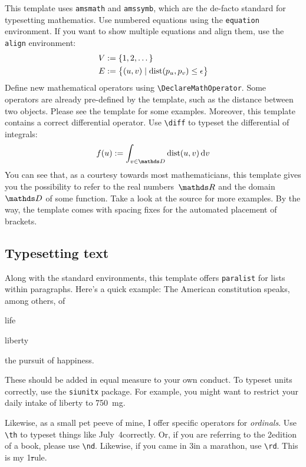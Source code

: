 This template uses \verb|amsmath| and \verb|amssymb|, which are the
de-facto standard for typesetting mathematics. Use numbered equations
using the \verb|equation| environment.
%
If you want to show multiple equations and align them, use the
\verb|align| environment:
%
\begin{align}
    V &:= \{ 1, 2, \dots \}\\
    E &:= \big\{ \left(u,v\right) \mid \dist\left(p_u, p_v\right) \leq \epsilon \big\}
\end{align}
%
Define new mathematical operators using \verb|\DeclareMathOperator|.
Some operators are already pre-defined by the template, such as the
distance between two objects. Please see the template for some examples.
%
Moreover, this template contains a correct differential operator. Use \verb|\diff| to typeset the differential of integrals:
%
\begin{equation}
  f(u) := \int_{v \in \domain}\dist(u,v)\diff{v}
\end{equation}
%
You can see that, as a courtesy towards most mathematicians, this
template gives you the possibility to refer to the real numbers~$\real$
and the domain~$\domain$ of some function. Take a look at the source for
more examples. By the way, the template comes with spacing fixes for the
automated placement of brackets.

\subsection{Typesetting text}

Along with the standard environments, this template offers
\verb|paralist| for lists within paragraphs.
%
Here's a quick example: The American constitution speaks, among others, of
%
\begin{inparaenum}[(i)]
  \item life
  \item liberty
  \item the pursuit of happiness.
\end{inparaenum}
%
These should be added in equal measure to your own conduct. To typeset
units correctly, use the \verb|siunitx| package. For example, you might
want to restrict your daily intake of liberty to \SI{750}{\milli\gram}.

Likewise, as a small pet peeve of mine, I offer specific operators for \emph{ordinals}. Use \verb|\th| to typeset things like July~4\th correctly. Or, if you are referring to the 2\nd edition of a book, please use \verb|\nd|. Likewise, if you came in 3\rd in a marathon, use \verb|\rd|. This is my 1\st rule.

